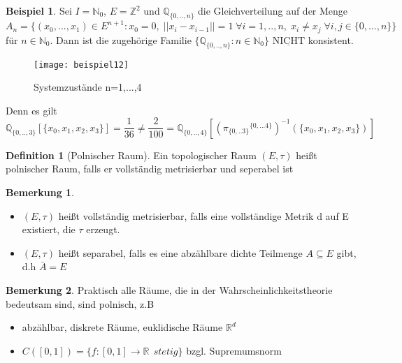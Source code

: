 \documentclass[a4paper,12pt]{scrartcl}
\theoremstyle{definition}
\newtheorem{bem}{Bemerkung}[section]
\newtheorem{bsp}{Beispiel}[section]
\newtheorem{defi}{Definition}[section]
\begin{document}
\begin{bsp}
Sei $I = \mathbb{N}_{0}$, $E = \mathbb{Z}^{2}$ und $\mathbb{Q}_{\lbrace 0,..,n \rbrace}$ die Gleichverteilung auf der Menge
\begin{equation*}
A_{n} = \lbrace (x_{0},...,x_{1}) \in E^{n+1} : x_{0} = 0, \; ||{x_{i} - x_{i-1}}|| = 1  \; \forall i = 1,..,n,\; x_{i} \neq x_{j} \; \forall i,j \in \lbrace 0,...,n \rbrace \rbrace
\end{equation*}
für $n \in \mathbb{N}_{0}$. Dann ist die zugehörige Familie $\lbrace \mathbb{Q}_{\lbrace 0,..,n \rbrace} : n \in \mathbb{N}_{0} \rbrace$ $\underline{\mathrm{NICHT}}$ konsistent.
\begin{figure}[H]
\texttt{[image: beispiel12]}
\caption{Systemzustände n=1,...,4}
\end{figure}

Denn es gilt
\begin{equation*}
\mathbb{Q}_{\lbrace 0,..,3 \rbrace}[\lbrace x_{0},x_{1},x_{2},x_{3} \rbrace] = \dfrac{1}{36} \neq \dfrac{2}{100} = \mathbb{Q}_{\lbrace 0,..,4 \rbrace}[{({\pi_{\lbrace 0,..3 \rbrace}}^{ \lbrace 0,...4 \rbrace})}^{-1}(\lbrace x_{0},x_{1},x_{2},x_{3} \rbrace)]
\end{equation*}
\end{bsp}
\begin{defi}[Polnischer Raum]
Ein topologischer Raum $(E,\tau)$ heißt polnischer Raum, falls er vollständig metrisierbar und seperabel ist
\end{defi}
\begin{bem}
\mbox{}  
\begin{itemize}
\item $(E,\tau)$ heißt vollständig metrisierbar, falls eine vollständige Metrik d auf E existiert, die $\tau$ erzeugt.
\item $(E,\tau)$ heißt separabel, falls es eine abzählbare dichte Teilmenge $A \subseteq E$ gibt, d.h $\bar{A} = E$ 
\end{itemize}
\end{bem}
\begin{bem}
Praktisch alle Räume, die in der Wahrscheinlichkeitstheorie bedeutsam sind, sind polnisch, z.B
\begin{itemize}
\item abzählbar, diskrete Räume, euklidische Räume $\mathbb{R}^{d}$
\item $C([0,1]) = \lbrace f:[0,1] \to \mathbb{R} \: \: stetig \rbrace$ bzgl. Supremumsnorm
\end{itemize}
\end{bem}
\end{document}
